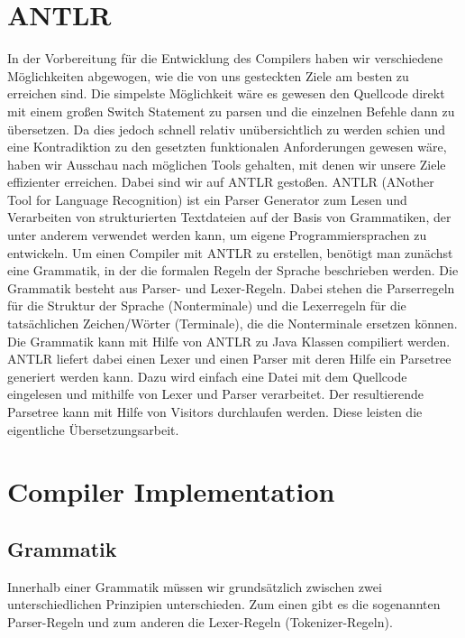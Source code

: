 \documentclass[paper=a4,fontsize=12pt,twocolumn]{scrreprt}
\begin{document}
\section{ANTLR}
In der Vorbereitung für die Entwicklung des Compilers haben wir verschiedene Möglichkeiten abgewogen, wie die von uns gesteckten Ziele am besten zu erreichen sind.
Die simpelste Möglichkeit wäre es gewesen den Quellcode direkt mit einem großen Switch Statement zu parsen und die einzelnen Befehle dann zu übersetzen.
Da dies jedoch schnell relativ unübersichtlich zu werden schien und eine Kontradiktion zu den gesetzten funktionalen Anforderungen gewesen wäre, haben wir Ausschau nach möglichen Tools gehalten, mit denen wir unsere Ziele effizienter erreichen.
Dabei sind wir auf ANTLR gestoßen.
ANTLR (ANother Tool for Language Recognition) ist ein Parser Generator zum Lesen und Verarbeiten von strukturierten Textdateien auf der Basis von Grammatiken, der unter anderem verwendet werden kann, um eigene Programmiersprachen zu entwickeln.
Um einen Compiler mit ANTLR zu erstellen, benötigt man zunächst eine Grammatik, in der die formalen Regeln der Sprache beschrieben werden.
Die Grammatik besteht aus Parser- und Lexer-Regeln.
Dabei stehen die Parserregeln für die Struktur der Sprache (Nonterminale) und die Lexerregeln für die tatsächlichen Zeichen/Wörter (Terminale), die die Nonterminale ersetzen können.
Die Grammatik kann mit Hilfe von ANTLR zu Java Klassen compiliert werden.
ANTLR liefert dabei einen Lexer und einen Parser mit deren Hilfe ein Parsetree generiert werden kann.
Dazu wird einfach eine Datei mit dem Quellcode eingelesen und mithilfe von Lexer und Parser verarbeitet.
Der resultierende Parsetree kann mit Hilfe von Visitors durchlaufen werden.
Diese leisten die eigentliche Übersetzungsarbeit.

\section{Compiler Implementation}

\subsection{Grammatik}
Innerhalb einer Grammatik müssen wir grundsätzlich zwischen zwei unterschiedlichen Prinzipien unterschieden.
Zum einen gibt es die sogenannten Parser-Regeln und zum anderen die Lexer-Regeln (Tokenizer-Regeln).
\end{document}
